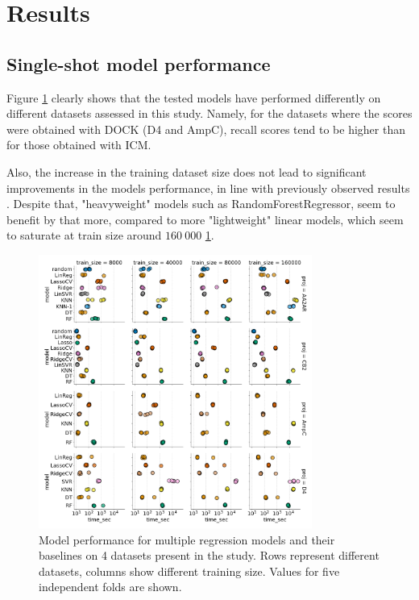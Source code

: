 \section{Results}

\subsection{Single-shot model performance}
\label{subsection:single-shot}

Figure \ref{fig:fig_3_singleshot} clearly shows that the tested models have performed differently on different datasets assessed in this study. Namely, for the datasets where the scores were obtained with DOCK (D4 and AmpC), recall scores tend to be higher than for those obtained with ICM.

Also, the increase in the training dataset size does not lead to significant improvements in the models performance, in line with previously observed results \cite{Yang2021_shoichet_active_learning}. Despite that, "heavyweight" models such as RandomForestRegressor, seem to benefit by that more, compared to more "lightweight" linear models, which seem to saturate at train size around $160\ 000$ \ref{fig:fig_3_singleshot}.

\begin{figure}[ht]
\centering
\includegraphics[width=0.8\textwidth]{figures/figure_3_single-shot-performance.png}
\caption{Model performance for multiple regression models and their baselines on 4 datasets present in the study. Rows represent different datasets, columns show different training size. Values for five independent folds are shown.}
\label{fig:fig_3_singleshot}
\end{figure}

